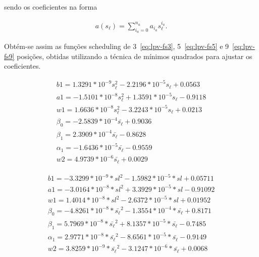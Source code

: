sendo os coeficientes na forma

\begin{equation}
	\label{eq:lpv-coeffs-form}
	\begin{split}
		a(s_\ell)=\sum_{i_a=0}^{n_a}a_{i_a}s_{\ell}^{i_a}.
	\end{split}
\end{equation}

Obtém-se assim as funções scheduling de 3~\eqref{eq:lpv-fs3},
5~\eqref{eq:lpv-fs5} e 9~\eqref{eq:lpv-fs9} posições, obtidas utilizando a
técnica de mínimos quadrados para ajustar os coeficientes.

\begin{equation}
	\label{eq:lpv-fs3}
	\begin{split}
		b1 = 1.3291*10^{-9} s_\ell^2 - 2.2196*10^{-5} s_\ell + 0.0563  \\
		a1 = -1.5101*10^{-8} s_\ell^2 + 1.3591*10^{-5} s_\ell - 0.9118 \\
		w1 = 1.6636*10^{-8} s_\ell^2 - 3.2243*10^{-5} s_\ell + 0.0213  \\
		\beta_0 = -2.5839*10^{-4} \bar{s_\ell} + 0.9036                \\
		\beta_1 = 2.3909*10^{-4} \bar{s_\ell} - 0.8628                 \\
		\alpha_1 = -1.6436*10^{-5} \bar{s_\ell} - 0.9559               \\
		w2 = 4.9739*10^{-6} \bar{s_\ell} + 0.0029
	\end{split}
\end{equation}

\begin{equation}
	\label{eq:lpv-fs5}
	\begin{split}
		b1 = -3.3299*10^{-9} * sl^2 - 1.5982*10^{-5} * sl + 0.05711                         \\
		a1 = -3.0164*10^{-8} * sl^2 + 3.3929*10^{-5} * sl - 0.91092                         \\
		w1 = 1.4014*10^{-8} * sl^2 - 2.6372*10^{-5} * sl + 0.01952                          \\
		\beta_0 = -4.8261*10^{-8} * \bar{s_\ell}^2 - 1.3554*10^{-4} * \bar{s_\ell} + 0.8171 \\
		\beta_1 = 5.7969*10^{-8} * \bar{s_\ell}^2 + 8.1357*10^{-5} * \bar{s_\ell} - 0.7485  \\
		\alpha_1 = 2.9771*10^{-8} * \bar{s_\ell}^2 - 8.6561*10^{-5} * \bar{s_\ell} - 0.9149 \\
		w2 = 3.8259*10^{-9} * \bar{s_\ell}^2 - 3.1247*10^{-6} * \bar{s_\ell} + 0.0068
	\end{split}
\end{equation}


